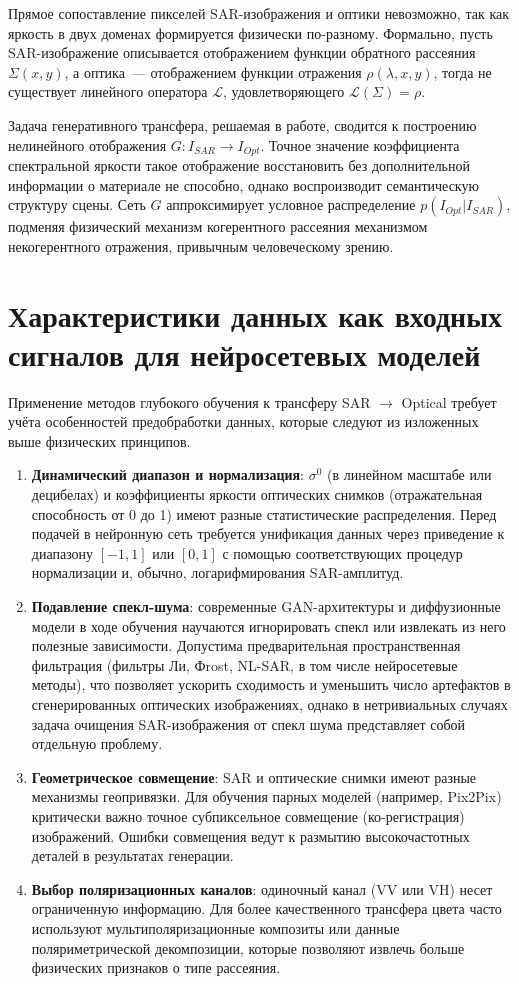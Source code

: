Прямое сопоставление пикселей SAR-изображения и оптики невозможно, так как яркость в двух доменах формируется физически по-разному.
Формально, пусть SAR-изображение описывается отображением функции обратного рассеяния $\Sigma(x,y)$, а оптика~--- отображением функции отражения $\rho(\lambda, x,y)$, тогда не существует линейного оператора $\mathcal{L}$, удовлетворяющего $\mathcal{L}(\Sigma) = \rho$.

Задача генеративного трансфера, решаемая в работе, сводится к построению нелинейного отображения $G: I_{SAR} \rightarrow I_{Opt}$.
Точное значение коэффициента спектральной яркости такое отображение восстановить без дополнительной информации о материале не способно, однако воспроизводит семантическую структуру сцены.
Сеть $G$ аппроксимирует условное распределение $p(I_{Opt} | I_{SAR})$, подменяя физический механизм когерентного рассеяния механизмом некогерентного отражения, привычным человеческому зрению.

\section{Характеристики данных как входных сигналов для нейросетевых моделей}
Применение методов глубокого обучения к трансферу SAR $\rightarrow$ Optical требует учёта особенностей предобработки данных, которые следуют из изложенных выше физических принципов.

\begin{enumerate}[label*=\arabic*.]
    \item \textbf{Динамический диапазон и нормализация}: $\sigma^0$ (в линейном масштабе или децибелах) и коэффициенты яркости оптических снимков (отражательная способность от 0 до 1) имеют разные статистические распределения. Перед подачей в нейронную сеть требуется унификация данных через приведение к диапазону $[-1, 1]$ или $[0, 1]$ с помощью соответствующих процедур нормализации и, обычно, логарифмирования SAR-амплитуд.
    \item \textbf{Подавление спекл-шума}: современные GAN-архитектуры и диффузионные модели в ходе обучения научаются игнорировать спекл или извлекать из него полезные зависимости. Допустима предварительная пространственная фильтрация (фильтры Ли, Фrost, NL-SAR, в том числе нейросетевые методы), что позволяет ускорить сходимость и уменьшить число артефактов в сгенерированных оптических изображениях, однако в нетривиальных случаях задача очищения SAR-изображения от спекл шума представляет собой отдельную проблему.
    \item \textbf{Геометрическое совмещение}: SAR и оптические снимки имеют разные механизмы геопривязки. Для обучения парных моделей (например, Pix2Pix) критически важно точное субпиксельное совмещение (ко-регистрация) изображений. Ошибки совмещения ведут к размытию высокочастотных деталей в результатах генерации.
    \item \textbf{Выбор поляризационных каналов}: одиночный канал (VV или VH) несет ограниченную информацию. Для более качественного трансфера цвета часто используют мультиполяризационные композиты или данные поляриметрической декомпозиции, которые позволяют извлечь больше физических признаков о типе рассеяния.
\end{enumerate}

